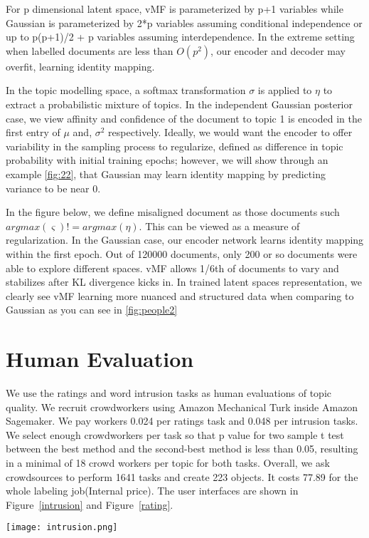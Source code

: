 \documentclass[11pt]{article}
\begin{document}
For p dimensional latent space, vMF is parameterized by p+1 variables while Gaussian is parameterized by 2*p variables assuming conditional independence or up to p(p+1)/2 + p variables assuming interdependence. In the extreme setting when labelled documents are less than $O(p^2)$, our encoder and decoder may overfit, learning identity mapping.

In the topic modelling space, a softmax transformation $\sigma$ is applied to $\eta$ to extract a probabilistic mixture of topics. In the independent Gaussian posterior case, we view affinity and confidence of the document to topic 1 is encoded in the first entry of $\mu$ and, $\sigma^2$ respectively. Ideally, we would want the encoder to offer variability in the sampling process to regularize, defined as difference in topic probability with initial training epochs; however, we will show through an example \ref{fig:22}, that Gaussian may learn identity mapping by predicting variance to be near 0. 

In the figure below, we define misaligned document as those documents such $argmax(\varsigma) != argmax(\eta)$. This can be viewed as a measure of regularization. In the Gaussian case, our encoder network learns identity mapping within the first epoch. Out of 120000 documents, only 200 or so documents were able to explore different spaces. vMF allows 1/6th of documents to vary and stabilizes after KL divergence kicks in. In trained latent spaces representation, we clearly see vMF learning more nuanced and structured data when comparing to Gaussian as you can see in \ref{fig:people2}






\section{Human Evaluation} \label{humanEval:sec}
We use the ratings and word intrusion tasks as human evaluations of topic quality. We recruit crowdworkers using Amazon Mechanical Turk inside Amazon Sagemaker. We pay workers 0.024 per ratings task and 0.048 per intrusion tasks. We select enough crowdworkers per task  so that p value for two sample t test between the best method and the second-best method is less than 0.05, resulting in a minimal of 18 crowd workers per topic for both tasks. Overall, we ask crowdsources to perform 1641 tasks and create 223 objects. It costs 77.89 for the whole labeling job(Internal price). The user interfaces are shown in Figure~\ref{intrusion} and Figure~\ref{rating}. 
\begin{figure*}
\centering
\texttt{[image: intrusion.png]}
\caption{User interface of intrusion task }
\label{intrusion}
\end{figure*}
\end{document}
